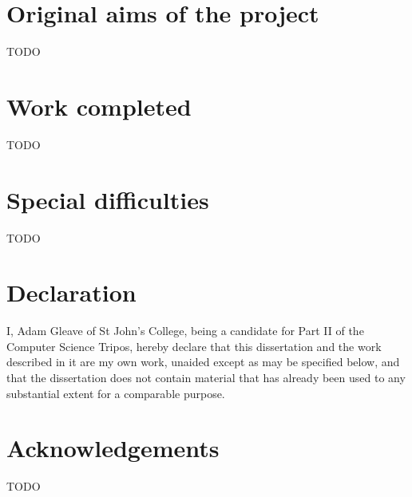 \documentclass[12pt,a4paper,twoside,notitlepage]{report}
\theoremstyle{plain}
\theoremstyle{definition}
\theoremstyle{remark}
\begin{document}
\section*{Original aims of the project}

TODO

\vspace*{-1em}
\section*{Work completed}

TODO

\vspace*{-1em}
\section*{Special difficulties}

TODO

\newpage

\section*{Declaration}

I, Adam Gleave of St John's College, being a candidate for Part II of the 
Computer Science Tripos, hereby declare that this dissertation and the work 
described in it are my own work, unaided except as may be specified below, and
that the dissertation does not contain material that has already been used to
any substantial extent for a comparable purpose.

\bigskip
{}
\medskip
{}

\clearpage

\tableofcontents

\listoffigures

\newpage
\section*{Acknowledgements}

TODO

\clearpage	%

\setcounter{page}{1}
\pagestyle{headings}



\cleardoublepage

\end{document}
